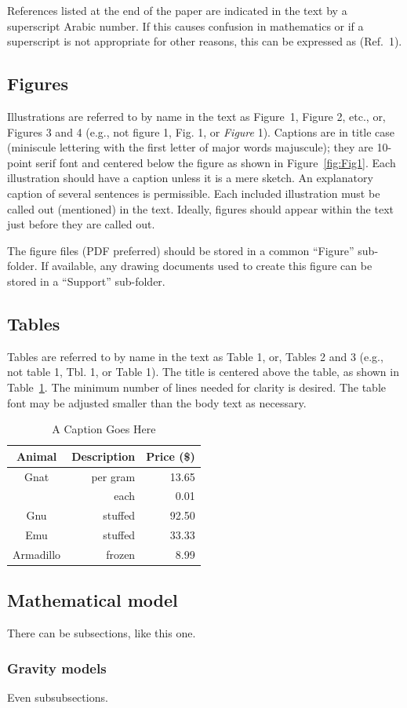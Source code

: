 References listed at the end of the paper are indicated in the text by a superscript Arabic number. If this causes confusion in mathematics or if a superscript is not appropriate for other reasons, this can be expressed as (Ref.~1). 

\subsection{Figures}
Illustrations are referred to by name in the text as Figure~1, Figure 2, etc., or, Figures 3 and 4 (e.g., not figure 1, Fig. 1, or \emph{Figure} 1). Captions are in title case (miniscule lettering with the first letter of major words majuscule); they are 10-point serif font and centered below the figure as shown in Figure~\ref{fig:Fig1}. Each illustration should have a caption unless it is a mere sketch. An explanatory caption of several sentences is permissible. Each included illustration must be called out (mentioned) in the text. Ideally, figures should appear within the text just before they are called out. 

The figure files (PDF preferred) should be stored in a common ``Figure'' sub-folder.  If available, any drawing documents used to create this figure can be stored in a ``Support'' sub-folder.

\subsection{Tables}
Tables are referred to by name in the text as Table 1, or, Tables 2 and 3 (e.g., not table 1, Tbl. 1, or Table 1). The title is centered above the table, as shown in Table~\ref{tab:label}. The minimum number of lines needed for clarity is desired. The table font may be adjusted smaller than the body text as necessary.

\begin{table}[htbp]
	\caption{A Caption Goes Here}
	\label{tab:label}
	\centering \fontsize{10}{10}\selectfont
	\begin{tabular}{c | r | r } %
		\hline 
		Animal    & Description & Price (\$)\\
		\hline 
		Gnat      & per gram & 13.65 \\
		& each     &  0.01 \\
		Gnu       & stuffed  & 92.50 \\
		Emu       & stuffed  & 33.33 \\
		Armadillo & frozen   &  8.99 \\
		\hline
	\end{tabular}
\end{table}

\subsection{Mathematical model}
There can be subsections, like this one.

\subsubsection{Gravity models}
Even subsubsections. 